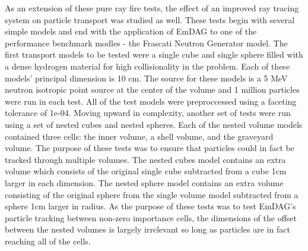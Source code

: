 \documentclass[12pt, a4paper]{article}
\begin{document}
As an extension of these pure ray fire tests, the effect of an improved ray tracing system on particle transport was studied as well. These tests begin with several simple models and end with the application of EmDAG to one of the performance benchmark modles - the Frascati Neutron Generator model. The first transport models to be tested were a single cube and single sphere filled with a dense hydrogen material for high collisionality in the problem. Each of these models' principal dimension is 10 cm. The source for these models is a 5 MeV neutron isotropic point source at the center of the volume and 1 million particles were run in each test. All of the test models were preproccessed using a faceting tolerance of 1e-04. Moving upward in complexity, another set of tests were run using a set of nested cubes and nested spheres. Each of the nested volume models contained three cells: the inner volume, a shell volume, and the graveyard volume. The purpose of these tests was to ensure that particles could in fact be tracked through multiple volumes. The nested cubes model contains an extra volume which consists of the original single cube subtracted from a cube 1cm larger in each dimension. The nested sphere model contains an extra volume consisting of the original sphere from the single volume model subtracted from a sphere 1cm larger in radius. As the purpose of these tests was to test EmDAG's particle tracking between non-zero importance cells, the dimensions of the offset between the nested volumes is largely irrelevant so long as particles are in fact reaching all of the cells.
\end{document}
